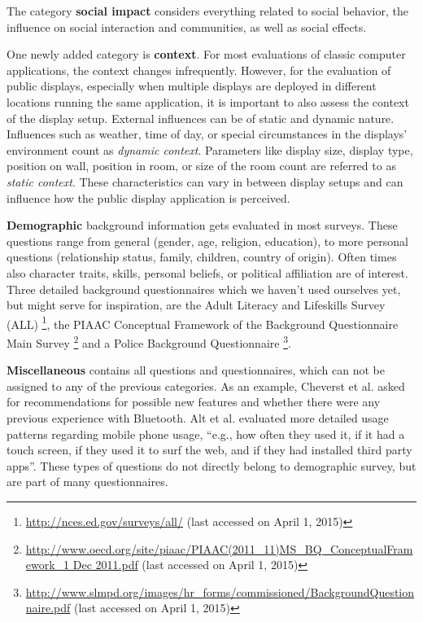 		The category \textbf{social impact} considers everything related to social behavior, the influence on social interaction and communities, as well as social effects.

	One newly added category is \textbf{context}. For most evaluations of classic computer applications, the context changes infrequently. However, for the evaluation of public displays, especially when multiple displays are deployed in different locations running the same application, it is important to also assess the context of the display setup. External influences can be of static and dynamic nature. Influences such as weather, time of day, or special circumstances in the displays' environment count as \textit{dynamic context}. Parameters like display size, display type, position on wall, position in room, or size of the room count are referred to as \textit{static context}. These characteristics can vary in between display setups and can influence how the public display application is perceived.

	\textbf{Demographic} background information gets evaluated in most surveys. These questions range from general (gender, age, religion, education), to more personal questions (relationship status, family, children, country of origin). Often times also character traits, skills, personal beliefs, or political affiliation are of interest.
	Three detailed background questionnaires which we haven't used ourselves yet, but might serve for inspiration, are the Adult Literacy and Lifeskills Survey (ALL) \footnote{\url{http://nces.ed.gov/surveys/all/} (last accessed on April 1, 2015)}, the PIAAC Conceptual Framework of the Background Questionnaire Main Survey \footnote{\url{http://www.oecd.org/site/piaac/PIAAC(2011_11)MS_BQ_ConceptualFramework_1 Dec 2011.pdf} (last accessed on April 1, 2015)} and a Police Background Questionnaire \footnote{\url{http://www.slmpd.org/images/hr_forms/commissioned/BackgroundQuestionnaire.pdf} (last accessed on April 1, 2015)}.

	\textbf{Miscellaneous} contains all questions and questionnaires, which can not be assigned to any of the previous categories. As an example, Cheverst et al. \cite{cheverst2005hermes} asked for recommendations for possible new features and whether there were any previous experience with Bluetooth. Alt et al. \cite{alt2011digifieds} evaluated more detailed usage patterns regarding mobile phone usage, ``e.g., how often they used it, if it had a touch screen, if they used it to surf the web, and if they had installed third party apps''. These types of questions do not directly belong to demographic survey, but are part of many questionnaires.








